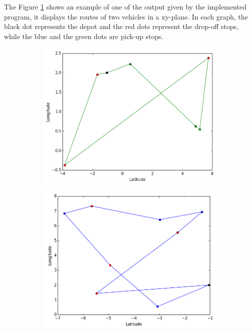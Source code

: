 \documentclass[tuberlin,cic,tc,openright,english,noabntcite,oneside]{iiufrgs}
\begin{document}
The Figure \ref{fig:output} shows an example of one of the output given by the implemented program, it displays the routes of two vehicles in a xy-plane. In each graph, the black dot represents the depot and the red dots represent the drop-off stops, while the blue and the green dots are pick-up stops.
\begin{figure}[H]
	\centering
    \caption{Example of output by the program}
    \begin{subfigure}[b]{0.49\textwidth}
	    \includegraphics[width=\textwidth]{fig_output1}
    \end{subfigure}
    \begin{subfigure}[b]{0.49\textwidth}
	    \includegraphics[width=\textwidth]{fig_output2}
    \end{subfigure}\par
    \label{fig:output}
\end{figure}
\end{document}
